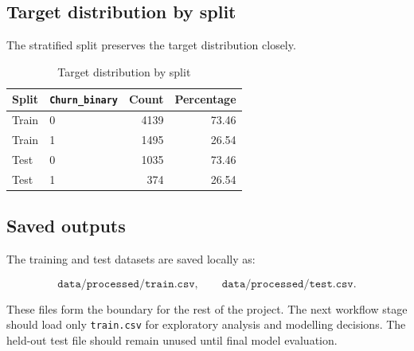 \subsection{Target distribution by split}

The stratified split preserves the target distribution closely.

\begin{table}[H]
\centering
\caption{Target distribution by split}
\begin{tabular}{llrr}
\toprule
Split & \texttt{Churn\_binary} & Count & Percentage \\
\midrule
Train & 0 & 4139 & 73.46 \\
Train & 1 & 1495 & 26.54 \\
Test & 0 & 1035 & 73.46 \\
Test & 1 & 374 & 26.54 \\
\bottomrule
\end{tabular}
\end{table}

\subsection{Saved outputs}

The training and test datasets are saved locally as:

\[
\texttt{data/processed/train.csv},
\qquad
\texttt{data/processed/test.csv}.
\]

These files form the boundary for the rest of the project. The next workflow stage should load only \texttt{train.csv} for exploratory analysis and modelling decisions. The held-out test file should remain unused until final model evaluation.
